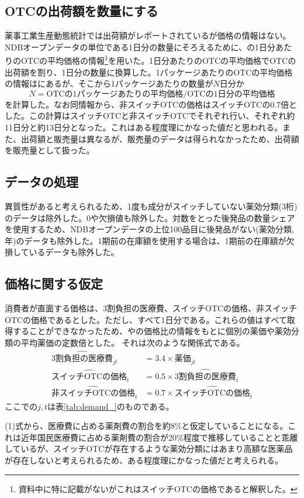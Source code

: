 \documentclass[a4paper,11pt,uplatex]{jsarticle}
\theoremstyle{definition}
\begin{document}
\subsection{OTCの出荷額を数量にする}
薬事工業生産動態統計では出荷額がレポートされているが価格の情報はない。NDBオープンデータの単位である1日分の数量にそろえるために、\cite{igarashi2021}の1日分あたりのOTCの平均価格の情報\footnote{資料中に特に記載がないがこれはスイッチOTCの価格であると解釈した。}を用いた。1日分あたりのOTCの平均価格でOTCの出荷額を割り、1日分の数量に換算した。1パッケージあたりのOTCの平均価格の情報は\cite{iseikyoku2021}にあるが、そこから1パッケージあたりの数量が\(N\)日分か
\[N= \textrm{OTCの1パッケージあたりの平均価格}/\textrm{OTCの1日分の平均価格}\]
を計算した。なお同情報から、非スイッチOTCの価格はスイッチOTCの0.7倍とした。この計算はスイッチOTCと非スイッチOTCでそれぞれ行い、それぞれ約11日分と約13日分となった。これはある程度理にかなった値だと思われる。また、出荷額と販売量は異なるが、販売量のデータは得られなかったため、出荷額を販売量として扱った。
\subsection{データの処理}\label{sec:data_process}
異質性があると考えられるため、1度も成分がスイッチしていない薬効分類(3桁)のデータは除外した。0や欠損値も除外した。対数をとった後発品の数量シェアを使用するため、NDBオープンデータの上位100品目に後発品がない(薬効分類,年)のデータも除外した。1期前の在庫額を使用する場合は、1期前の在庫額が欠損しているデータも除外した。
\subsection{価格に関する仮定}
消費者が直面する価格は、3割負担の医療費、スイッチOTCの価格、非スイッチOTCの価格であるとした。ただし、すべて1日分である。これらの値はすべて取得することができなかったため、\cite{igarashi2021,igarashi2022}や\cite{iseikyoku2021}の価格比の情報をもとに個別の薬価や薬効分類の平均薬価の定数倍とした。 それは次のような関係式である。
\begin{align}
    \widehat {3割負担の医療費}_{jt}&=3.4\times 薬価_{jt}\\
    \widehat {\textrm{スイッチOTCの価格}}_t&=0.5 \times \widehat{\textrm{3割負担の医療費}}_t\\
    \widehat {\textrm{非スイッチOTCの価格}}_t&=0.7 \times \widehat {\textrm{スイッチOTCの価格}}_t
\end{align}
ここでの\(j,t\)は表\ref{tab:demand_}のものである。

(1)式から、医療費に占める薬剤費の割合を約8\%と仮定していることになる。これは近年国民医療費に占める薬剤費の割合が20\%程度で推移していることと乖離しているが、スイッチOTCが存在するような薬効分類にはあまり高額な医薬品が存在しないと考えられるため、ある程度理にかなった値だと考えられる。
\end{document}
